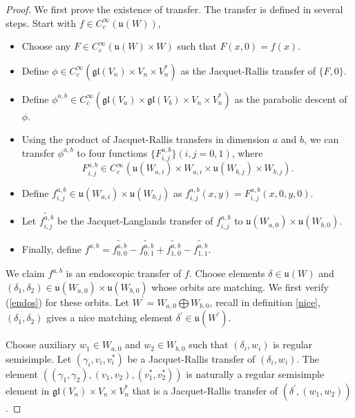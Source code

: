 \documentclass[11pt, oneside,reqno]{amsart}   	%
\begin{document}
\begin{proof}

We first prove the existence of transfer. The transfer is defined in several steps. Start with $f \in C_c^\infty(\mathfrak{u}(W))$,
\begin{itemize}
\item Choose any $F \in C_c^\infty(\mathfrak{u}(W)\times W)$ such that $F(x,0)=f(x)$.
\item Define $\phi \in C_c^\infty(\mathfrak{gl}(V_n)\times V_n \times V_n^*)$ as the Jacquet-Rallis transfer of $\{F,0\}$.
\item Define $\phi^{a,b} \in C_c^\infty(\mathfrak{gl}(V_a) \times \mathfrak{gl}(V_b) \times V_n \times V_n^*)$ as the parabolic descent of $\phi$.
\item Using the product of Jacquet-Rallis transfers in dimension $a$ and $b$, we can transfer $\phi^{a,b}$ to four functions $\{F^{a,b}_{i,j}\}({i, j = 0,1})$, where $$F^{a,b}_{i,j} \in C_c^\infty(\mathfrak{u}(W_{a,i})\times W_{a,i} \times \mathfrak{u}(W_{b,j})\times W_{b,j}).$$
\item Define $f^{a,b}_{i,j} \in \mathfrak{u}(W_{a,i}) \times \mathfrak{u}(W_{b,j})$ as $f^{a,b}_{i,j}(x,y)=F^{a,b}_{i,j}(x,0,y,0).$
\item Let $\widetilde{f^{a,b}_{i,j}}$ be the Jacquet-Langlands transfer of $f^{a,b}_{i,j}$ to $\mathfrak{u}(W_{a,0}) \times \mathfrak{u}(W_{b,0}).$
\item Finally, define $f^{a,b}=\widetilde{f^{a,b}_{0,0}}-\widetilde{f^{a,b}_{0,1}}+\widetilde{f^{a,b}_{1,0}}-\widetilde{f^{a,b}_{1,1}}.$
\end{itemize}

We claim $f^{a,b}$ is an endoscopic transfer of $f$. Choose elements $\delta \in \mathfrak{u}(W)$ and $(\delta_1, \delta_2) \in \mathfrak{u}(W_{a,0}) \times \mathfrak{u}(W_{b,0})$ whose orbits are matching. We first verify (\ref{endos}) for these orbits. Let $W^\prime = W_{a,0} \bigoplus W_{b,0}$, recall in definition \ref{nice}, $(\delta_1, \delta_2)$ gives a nice matching element $\delta^\prime \in \mathfrak{u}(W^\prime)$.

Choose auxiliary $w_1 \in W_{a,0}$ and $w_2 \in W_{b,0}$ such that $(\delta_i, w_i)$ is regular semisimple. Let $(\gamma_i,v_i,v_i^*)$ be a Jacquet-Rallis transfer of $(\delta_i, w_i)$. The element $((\gamma_1,\gamma_2), (v_1,v_2), (v_1^*,v_2^*))$ is naturally a regular semisimple element in $\mathfrak{gl}(V_n)\times V_n \times V_n^*$ that is a Jacquet-Rallis transfer of $(\delta^\prime,(w_1, w_2))$. 


\end{proof}
\end{document}
